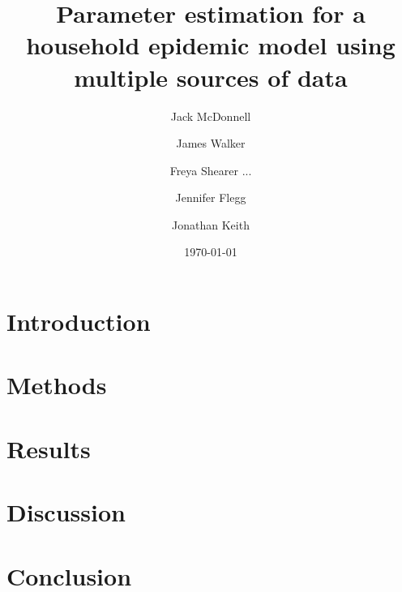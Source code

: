 \documentclass{article}
\title{Parameter estimation for a household epidemic model using multiple sources of data}
\author{Jack McDonnell \and James Walker \and Freya Shearer ... \and Jennifer Flegg \and Jonathan Keith }
\date{\today}
\begin{document}
\maketitle
\begin{abstract}

\end{abstract}

\section{Introduction}


\section{Methods}


\section{Results}
% 

\section{Discussion}


\section{Conclusion}


\newpage
	
\end{document}
